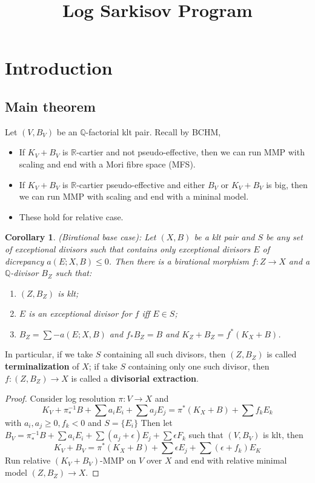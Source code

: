 \documentclass{article}
\title{Log Sarkisov Program}
\date{}
\newtheorem{cor}[defn]{Corollary}
\begin{document}
	\maketitle
	\tableofcontents
	\newpage
\section{Introduction}
\subsection{Main theorem}
Let $ (V,B_V) $ be an $ \mathbb{Q} $-factorial klt pair. Recall by BCHM, 
\begin{itemize}
	\item If  $ K_V+B_V $ is $ \mathbb{R} $-cartier and not pseudo-effective, then we can run MMP with scaling and  end with a Mori fibre space (MFS). 
	\item If $ K_V+B_V $ is $ \mathbb{R} $-cartier pseudo-effective and either $ B_V $ or $ K_V+B_V $ is big, then we can run MMP with scaling and end with a mininal model.
	\item These hold for relative case.
\end{itemize}
\begin{cor}\label{extraction}
	(Birational base case): Let $ (X,B) $ be a klt pair and $ S $ be any set of exceptional divisors such that  contains only exceptional divisors $ E $ of dicrepancy $ a(E;X,B)\leqslant 0 $. Then there is a birational morphism $ f:Z\to X $ and a $ \mathbb{Q} $-divisor $ B_Z $ such that:
	\begin{enumerate}
		\item $ (Z,B_Z) $ is klt;
		\item $ E $ is an exceptional divisor for $ f $ iff $ E\in S $;
		\item $ B_Z=\sum-a(E;X,B) $ and $ f_*B_Z=B $ and $ K_Z+B_Z=f^*(K_X+B) $.
	\end{enumerate} 
\end{cor}
In particular, if we take $ S $ containing all such divisors, then $ (Z,B_Z) $ is called \textbf{terminalization} of $ X $; if take $ S $ containing only one such divisor, then $ f:(Z,B_Z)\to X $ is called a \textbf{divisorial extraction}.	
\begin{proof}
	Consider log resolution $ \pi:V\to X $ and 
	$$ K_V+\pi^{-1}_*B+\sum a_iE_i +\sum a_jE_j=\pi^*(K_X+B)+\sum f_kE_k$$
	with $ a_i,a_j\geqslant 0, f_k<0 $ and $ S=\{ E_i \} $
	Then let $ B_V=\pi^{-1}_*B+\sum a_iE_i +\sum (a_j+\epsilon)E_j+\sum \epsilon F_k $ such that $ (V,B_V) $ is klt, then 
	$$ K_V+B_V=\pi^*(K_X+B)+\sum \epsilon E_j+\sum (\epsilon+f_k)E_K $$
	Run relative $ (K_V+B_V) $-MMP on $ V $ over $ X $ and end with relative minimal model $ (Z,B_Z)\to X $.
\end{proof}
\end{document}
